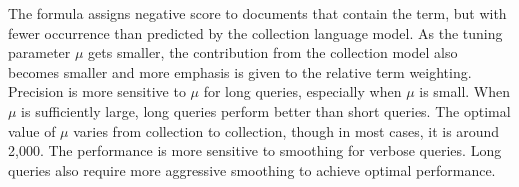 The formula assigns negative score to documents that contain the term, but with fewer occurrence than predicted by the collection language model. As the tuning parameter $ \mu $ gets smaller, the contribution from the collection model also becomes smaller and more emphasis is given to the relative term weighting. Precision is more sensitive to $ \mu $ for long queries, especially when $ \mu $ is small. When $ \mu $ is sufficiently large, long queries perform better than short queries. The optimal value of $ \mu $ varies from collection to collection, though in most cases, it is around 2,000. The performance is more sensitive to smoothing for verbose queries. Long queries also require more aggressive smoothing to achieve optimal performance. 